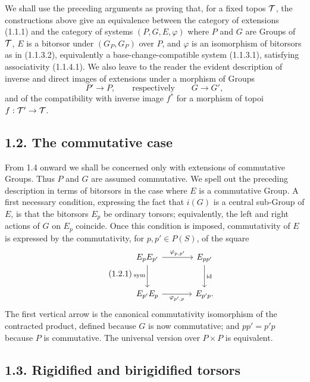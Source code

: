 \documentclass[11pt]{article}
\providecommand{\id}{\operatorname{id}}
\begin{document}
We shall use the preceding arguments as proving that, for a fixed topos \(\mathcal T\), the constructions above give an equivalence between the category of extensions (1.1.1) and the category of systems \((P,G,E,\varphi)\) where \(P\) and \(G\) are Groups of \(\mathcal T\), \(E\) is a bitorsor under \((G_P,G_P)\) over \(P\), and \(\varphi\) is an isomorphism of bitorsors as in (1.1.3.2), equivalently a base-change-compatible system (1.1.3.1), satisfying associativity (1.1.4.1).  We also leave to the reader the evident description of inverse and direct images of extensions under a morphism of Groups
\[
  P'\longrightarrow P,\qquad\text{respectively}\qquad G\longrightarrow G',
\]
and of the compatibility with inverse image \(f^*\) for a morphism of topoi \(f:\mathcal T'\to\mathcal T\).

\subsection*{1.2. The commutative case}

From 1.4 onward we shall be concerned only with extensions of commutative Groups.  Thus \(P\) and \(G\) are assumed commutative.  We spell out the preceding description in terms of bitorsors in the case where \(E\) is a commutative Group.  A first necessary condition, expressing the fact that \(i(G)\) is a central sub-Group of \(E\), is that the bitorsors \(E_p\) be ordinary torsors; equivalently, the left and right actions of \(G\) on \(E_p\) coincide.  Once this condition is imposed, commutativity of \(E\) is expressed by the commutativity, for \(p,p'\in P(S)\), of the square
\begin{equation}\qquad\text{(1.2.1)}
\begin{tikzcd}[column sep=large,row sep=large]
E_pE_{p'}\arrow[r,"\varphi_{p,p'}"]\arrow[d,"\sym"']&
E_{pp'}\arrow[d,"\id"]\\
E_{p'}E_p\arrow[r,"\varphi_{p',p}"']&
E_{p'p}.
\end{tikzcd}
\end{equation}
The first vertical arrow is the canonical commutativity isomorphism of the contracted product, defined because \(G\) is now commutative; and \(pp'=p'p\) because \(P\) is commutative.  The universal version over \(P\times P\) is equivalent.

\subsection*{1.3. Rigidified and birigidified torsors}
\end{document}
